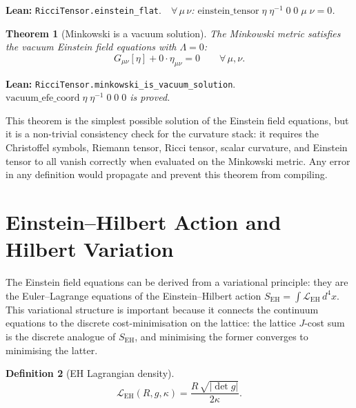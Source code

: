 \documentclass[11pt,a4paper]{article}
\newtheorem{theorem}{Theorem}[section]
\newtheorem{definition}[theorem]{Definition}
\newcommand{\Jcost}{J}
\newcommand{\lean}[1]{\texttt{#1}}
\newcommand{\leanref}[2]{\noindent\textbf{Lean:} \lean{#1}.\ \ \textit{#2}}
\begin{document}
\leanref{RicciTensor.einstein\_flat}{$\forall\,\mu\,\nu$: $\mathrm{einstein\_tensor}\;\eta\;\eta^{-1}\;0\;0\;\mu\;\nu = 0$.}

\begin{theorem}[Minkowski is a vacuum solution]
\label{thm:minkowski_vacuum}
The Minkowski metric satisfies the vacuum Einstein field equations with $\Lambda = 0$:
\begin{equation}\label{eq:vacuum}
G_{\mu\nu}[\eta] + 0 \cdot \eta_{\mu\nu} = 0 \qquad \forall\,\mu,\nu.
\end{equation}
\end{theorem}

\leanref{RicciTensor.minkowski\_is\_vacuum\_solution}{$\mathrm{vacuum\_efe\_coord}\;\eta\;\eta^{-1}\;0\;0\;0$ is proved.}

\noindent This theorem is the simplest possible solution of the Einstein field equations, but it is a non-trivial consistency check for the curvature stack: it requires the Christoffel symbols, Riemann tensor, Ricci tensor, scalar curvature, and Einstein tensor to all vanish correctly when evaluated on the Minkowski metric.
Any error in any definition would propagate and prevent this theorem from compiling.

\section{Einstein--Hilbert Action and Hilbert Variation}
\label{sec:eh}

The Einstein field equations can be derived from a variational principle: they are the Euler--Lagrange equations of the Einstein--Hilbert action $S_{\mathrm{EH}} = \int \mathcal{L}_{\mathrm{EH}}\,d^4x$.
This variational structure is important because it connects the continuum equations to the discrete cost-minimisation on the lattice: the lattice $\Jcost$-cost sum is the discrete analogue of $S_{\mathrm{EH}}$, and minimising the former converges to minimising the latter.

\begin{definition}[EH Lagrangian density]
\label{def:eh}
\begin{equation}\label{eq:eh}
\mathcal{L}_{\mathrm{EH}}(R, g, \kappa) = \frac{R\,\sqrt{|\det g|}}{2\kappa}.
\end{equation}
\end{definition}
\end{document}
